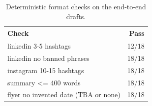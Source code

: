 \begin{table}[t]
\centering
\caption{Deterministic format checks on the end-to-end drafts.}
\label{tab:format}
\footnotesize
\setlength{\tabcolsep}{3.5pt}
\begin{tabular}{lr}
\toprule
Check & Pass \\
\midrule
linkedin 3-5 hashtags & 12/18 \\
linkedin no banned phrases & 18/18 \\
instagram 10-15 hashtags & 18/18 \\
summary <= 400 words & 18/18 \\
flyer no invented date (TBA or none) & 18/18 \\
\bottomrule
\end{tabular}
\end{table}
